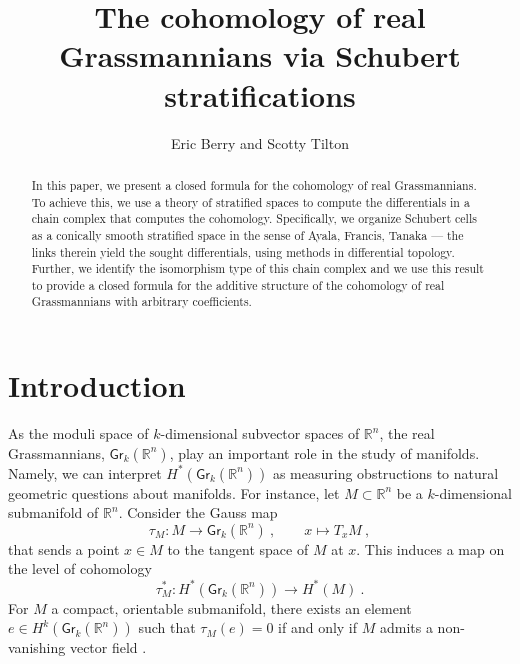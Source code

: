 \documentclass{article}
\title{The cohomology of real Grassmannians via Schubert stratifications}
\author{Eric Berry and Scotty Tilton}
\newcommand{\bb}[1]{\mathbb{#1}}
\newcommand{\msf}[1]{\mathsf{#1}}
\newcommand{\gr}{\msf{Gr}}
\theoremstyle{definition}
\begin{document}
\maketitle




\begin{abstract}

    In this paper, we present a closed formula for the cohomology of real Grassmannians.
    To achieve this, we use a theory of stratified spaces to compute the differentials in a chain complex that computes the cohomology.
    Specifically, we organize Schubert cells as a conically smooth stratified space in the sense of Ayala, Francis, Tanaka — the links therein yield the sought differentials, using methods in differential topology.  
    Further, we identify the isomorphism type of this chain complex and we use this result to
    provide a closed formula for the additive structure of the 
    cohomology of real Grassmannians with arbitrary coefficients.
\end{abstract}

\section{Introduction}

As the moduli space of $k$-dimensional subvector spaces of $\bb{R}^n$, the real Grassmannians, 
$\gr_k(\bb{R}^n)$, play an important role in the study of manifolds. Namely, we can interpret
$H^*(\gr_k(\bb{R}^n))$ as measuring obstructions to natural geometric questions about manifolds.
For instance, let $M \subset \bb{R}^n$
be a $k$-dimensional submanifold of $\bb{R}^n$. Consider the Gauss map
$$\tau_M: M \to \gr_k(\bb{R}^n)~, \qquad x \mapsto T_xM~,$$
that sends a point $x \in M$ to the tangent space of $M$ at $x$. This induces a map on the level of cohomology
$$\tau_M^*:H^*(\gr_k(\bb{R}^n)) \to H^*(M)~.$$ 
For $M$ a compact, orientable submanifold, there exists an element 
$e \in H^k(\gr_k(\bb{R}^n))$ such that $\tau_M(e) = 0$ if and only if $M$ admits a non-vanishing vector field
\cite{characteristic}.\\
\end{document}
